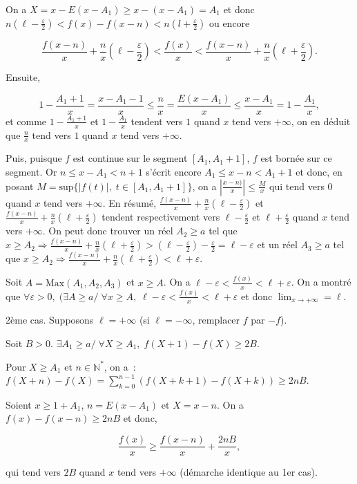 \documentclass[11pt,a4paper]{article}
\newcommand{\Nn}{\mathbb{N}} \newcommand{\N}{\mathbb{N}}
\begin{document}
On a $X=x-E(x-A_1)\geq x-(x-A_1)=A_1$ et donc $n(\ell-\frac{\varepsilon}{2})<f(x)-f(x-n)<n(l+\frac{\varepsilon}{2})$ ou encore

$$\frac{f(x-n)}{x}+\frac{n}{x}(\ell-\frac{\varepsilon}{2})<\frac{f(x)}{x}<\frac{f(x-n)}{x}+\frac{n}{x}(\ell+\frac{\varepsilon}{2}).$$

Ensuite,

$$1-\frac{A_1+1}{x}=\frac{x-A_1-1}{x}\leq\frac{n}{x}=\frac{E(x-A_1)}{x}\leq\frac{x-A_1}{x}=1-\frac{A_1}{x},$$ et comme $1-\frac{A_1+1}{x}$ et $1-\frac{A_1}{x}$ tendent vers $1$ quand $x$ tend vers $+\infty$, on en déduit que $\frac{n}{x}$ tend vers $1$ quand $x$ tend vers $+\infty$.

Puis, puisque $f$ est continue sur le segment $[A_1,A_1+1]$, $f$ est bornée sur ce segment. Or $n\leq x-A_1<n+1$ s'écrit encore $A_1\leq x-n <A_1+1$ et donc, en posant $M=\mbox{sup}\{|f(t)|,\;t\in[A_1,A_1+1]\}$, on a $\left|\frac{x-n)}{x}\right|\leq\frac{M}{x}$ qui tend vers $0$ quand $x$ tend vers $+\infty$. En résumé, $\frac{f(x-n)}{x}+\frac{n}{x}(\ell-\frac{\varepsilon}{2})$ et $\frac{f(x-n)}{x}+\frac{n}{x}(\ell+\frac{\varepsilon}{2})$ tendent respectivement vers $\ell-\frac{\varepsilon}{2}$ et $\ell+\frac{\varepsilon}{2}$ quand $x$ tend vers $+\infty$. On peut donc trouver un réel $A_2\geq a$ tel que $x\geq A_2\Rightarrow\frac{f(x-n)}{x}+\frac{n}{x}(\ell+\frac{\varepsilon}{2})>(\ell-\frac{\varepsilon}{2})-\frac{\varepsilon}{2}=\ell-\varepsilon$ et un réel $A_3\geq a$ tel que $x\geq A_2\Rightarrow\frac{f(x-n)}{x}+\frac{n}{x}(\ell+\frac{\varepsilon}{2})<\ell+\varepsilon$.

Soit $A=\mbox{Max}(A_1,A_2,A_3)$ et $x\geq A$. On a $\ell-\varepsilon<\frac{f(x)}{x}<\ell+\varepsilon$. On a montré que $\forall\varepsilon>0,\;(\exists A\geq a/\;\forall x\geq A,\;\ell-\varepsilon<\frac{f(x)}{x}<\ell+\varepsilon$ et donc $\lim_{x\rightarrow +\infty}=\ell$.

2ème cas. Supposons $\ell=+\infty$ (si $\ell=-\infty$, remplacer $f$ par $-f$).

Soit $B>0$. $\exists A_1\geq a/\;\forall X\geq A_1,\;f(X+1)-f(X)\geq 2B$.

Pour $X\geq A_1$ et $n\in\Nn^*$, on a~:~$f(X+n)-f(X)=\sum_{k=0}^{n-1}(f(X+k+1)-f(X+k))\geq2nB$.

Soient $x\geq1+A_1$, $n=E(x-A_1)$ et $X=x-n$. On a $f(x)-f(x-n)\geq2nB$ et donc,

$$\frac{f(x)}{x}\geq\frac{f(x-n)}{x}+\frac{2nB}{x},$$

qui tend vers $2B$ quand $x$ tend vers $+\infty$ (démarche identique au 1er cas).
\end{document}
